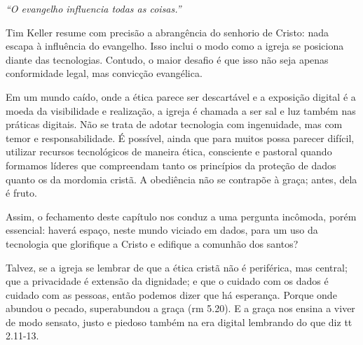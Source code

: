 \textit{``O evangelho influencia todas as coisas.''} \cite[p.~56]{keller2014}

Tim Keller resume com precisão a abrangência do senhorio de Cristo: nada escapa à influência do evangelho. Isso inclui o modo como a igreja se posiciona diante das tecnologias. Contudo, o maior desafio é que isso não seja apenas conformidade legal, mas convicção evangélica.

Em um mundo caído, onde a ética parece ser descartável e a exposição digital é a moeda da visibilidade e realização, a igreja é chamada a ser sal e luz também nas práticas digitais. Não se trata de adotar tecnologia com ingenuidade, mas com temor e responsabilidade. É possível, ainda que para muitos possa parecer difícil, utilizar recursos tecnológicos de maneira ética, consciente e pastoral quando formamos líderes que compreendam tanto os princípios da proteção de dados quanto os da mordomia cristã. A obediência não se contrapõe à graça; antes, dela é fruto.

Assim, o fechamento deste capítulo nos conduz a uma pergunta incômoda, porém essencial: haverá espaço, neste mundo viciado em dados, para um uso da tecnologia que glorifique a Cristo e edifique a comunhão dos santos?

Talvez, se a igreja se lembrar de que a ética cristã não é periférica, mas central; que a privacidade é extensão da dignidade; e que o cuidado com os dados é cuidado com as pessoas,  então podemos dizer que há esperança. Porque onde abundou o pecado, superabundou a graça (\gls{rm} 5.20). E a graça nos ensina a viver de modo sensato, justo e piedoso também na era digital lembrando do que diz \gls{tt} 2.11-13.